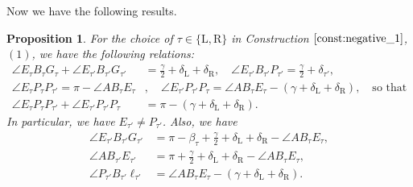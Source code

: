 \documentclass[11pt]{amsart}
\newtheorem{proposition}[theorem]{Proposition}
\numberwithin{equation}{section}
\numberwithin{theorem}{section}
\newcommand{\Lt}{\ensuremath{\mathrm{L}}}
\newcommand{\Rt}{\ensuremath{\mathrm{R}}}
\begin{document}
Now we have the following results.
\begin{proposition}\label{prop:angle_relations}
For the choice of $\tau\in\{\Lt ,\Rt\}$ in Construction $\ref{const:negative_1}$, $(1)$, we have the following relations:
\begin{equation}\label{eq:angle_relations_1}
\begin{aligned}
\angle E_\tau B_\tau G_\tau +\angle E_{\tau'}B_{\tau'}G_{\tau'}&=\frac{\gamma}{2}+\delta_\Lt +\delta_\Rt ,\quad
\angle E_{\tau'}B_{\tau'}P_{\tau'}=\frac{\gamma}{2}+\delta_{\tau'},\\
\angle E_\tau P_\tau P_{\tau'}=\pi -\angle AB_\tau E_\tau&,\quad\angle E_{\tau'}P_{\tau'}P_\tau =\angle AB_\tau E_\tau -(\gamma +\delta_\Lt +\delta_\Rt ),
\quad\text{so that}\\
\angle E_\tau P_\tau P_{\tau'}+\angle E_{\tau'}P_{\tau'}P_\tau&=\pi -(\gamma +\delta_\Lt +\delta_\Rt ).
\end{aligned}
\end{equation}
In particular, we have $E_{\tau'}\neq P_{\tau'}$. Also, we have
\begin{equation}\label{eq:angle_relations_2}
\begin{aligned}
\angle E_{\tau'}B_{\tau'}G_{\tau'}&=\pi -\beta_\tau +\frac{\gamma}{2}+\delta_\Lt +\delta_\Rt -\angle AB_\tau E_\tau ,\\
\angle AB_{\tau'}E_{\tau'}&=\pi +\frac{\gamma}{2}+\delta_\Lt +\delta_\Rt -\angle AB_\tau E_\tau ,\\
\angle P_{\tau'}B_{\tau'}\ell_{\tau'}&=\angle AB_\tau E_\tau -(\gamma +\delta_\Lt +\delta_\Rt ).
\end{aligned}
\end{equation}
\end{proposition}
\end{document}
